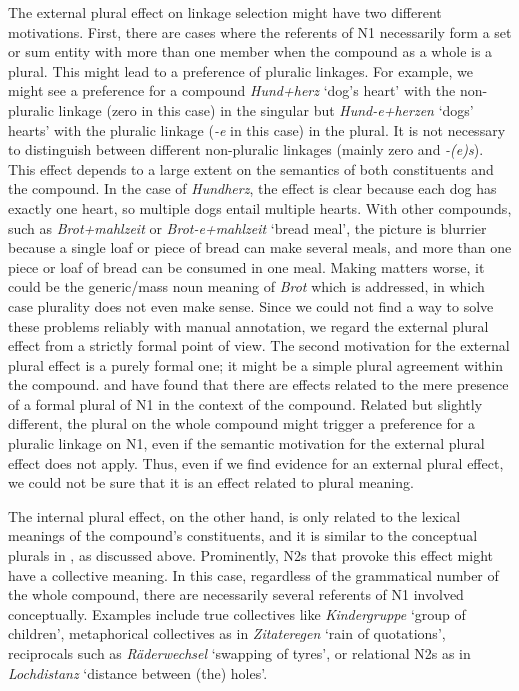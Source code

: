 The external plural effect on linkage selection might have two different motivations.
First, there are cases where the referents of N1 necessarily form a set or sum entity with more than one member when the compound as a whole is a plural.
This might lead to a preference of pluralic linkages.
For example, we might see a preference for a compound \textit{Hund+herz} `dog's heart' with the non-pluralic linkage (zero in this case) in the singular but \textit{Hund-e+herzen} `dogs' hearts' with the pluralic linkage (\textit{-e} in this case) in the plural.
It is not necessary to distinguish between different non-pluralic linkages (mainly zero and \textit{-(e)s}).
This effect depends to a large extent on the semantics of both constituents and the compound.
In the case of \textit{Hundherz}, the effect is clear because each dog has exactly one heart, so multiple dogs entail multiple hearts.
With other compounds, such as \textit{Brot+mahlzeit} or \textit{Brot-e+mahlzeit} `bread meal', the picture is blurrier because a single loaf or piece of bread can make several meals, and more than one piece or loaf of bread can be consumed in one meal.
Making matters worse, it could be the generic\slash mass noun meaning of \textit{Brot} which is addressed, in which case plurality does not even make sense.
Since we could not find a way to solve these problems reliably with manual annotation, we regard the external plural effect from a strictly formal point of view.
The second motivation for the external plural effect is a purely formal one; it might be a simple plural agreement within the compound.
\textcite{BangaEa2013a} and \textcite{BangaEa2013b} have found that there are effects related to the mere presence of a formal plural of N1 in the context of the compound.
Related but slightly different, the plural on the whole compound might trigger a preference for a pluralic linkage on N1, even if the semantic motivation for the external plural effect does not apply.
Thus, even if we find evidence for an external plural effect, we could not be sure that it is an effect related to plural meaning.

The internal plural effect, on the other hand, is only related to the lexical meanings of the compound's constituents, and it is similar to the conceptual plurals in \textcite{BangaEa2013b}, as discussed above.
Prominently, N2s that provoke this effect might have a collective meaning.
In this case, regardless of the grammatical number of the whole compound, there are necessarily several referents of N1 involved conceptually.
Examples include true collectives like \textit{Kindergruppe} `group of children', metaphorical collectives as in \textit{Zitateregen} `rain of quotations', reciprocals such as \textit{Räderwechsel} `swapping of tyres', or relational N2s as in \textit{Lochdistanz} `distance between (the) holes'.

